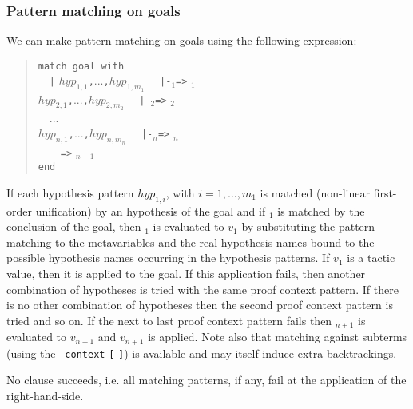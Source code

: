 \subsubsection[Pattern matching on goals]{Pattern matching on goals
}

We can make pattern matching on goals using the following expression:
\begin{quote}
\begin{tabbing}
{\tt match goal with}\\
~~\={\tt |} $hyp_{1,1}${\tt ,}...{\tt ,}$hyp_{1,m_1}$
   ~~{\tt |-}{\cpattern}$_1${\tt =>} {\tacexpr}$_1$\\
  \>{\tt |} $hyp_{2,1}${\tt ,}...{\tt ,}$hyp_{2,m_2}$
   ~~{\tt |-}{\cpattern}$_2${\tt =>} {\tacexpr}$_2$\\
~~...\\
  \>{\tt |} $hyp_{n,1}${\tt ,}...{\tt ,}$hyp_{n,m_n}$
   ~~{\tt |-}{\cpattern}$_n${\tt =>} {\tacexpr}$_n$\\
  \>{\tt |\_}~~~~{\tt =>} {\tacexpr}$_{n+1}$\\
{\tt end}
\end{tabbing}
\end{quote}

If each hypothesis pattern $hyp_{1,i}$, with $i=1,...,m_1$
is matched (non-linear first-order unification) by an hypothesis of
the goal and if {\cpattern}$_1$ is matched by the conclusion of the
goal, then {\tacexpr}$_1$ is evaluated to $v_1$ by substituting the
pattern matching to the metavariables and the real hypothesis names
bound to the possible hypothesis names occurring in the hypothesis
patterns. If $v_1$ is a tactic value, then it is applied to the
goal. If this application fails, then another combination of
hypotheses is tried with the same proof context pattern. If there is
no other combination of hypotheses then the second proof context
pattern is tried and so on. If the next to last proof context pattern
fails then {\tacexpr}$_{n+1}$ is evaluated to $v_{n+1}$ and $v_{n+1}$
is applied. Note also that matching against subterms (using the {\tt
context} {\ident} {\tt [} {\cpattern} {\tt ]}) is available and may
itself induce extra backtrackings.

\ErrMsg {}

No clause succeeds, i.e. all matching patterns, if any,
fail at the application of the right-hand-side.

